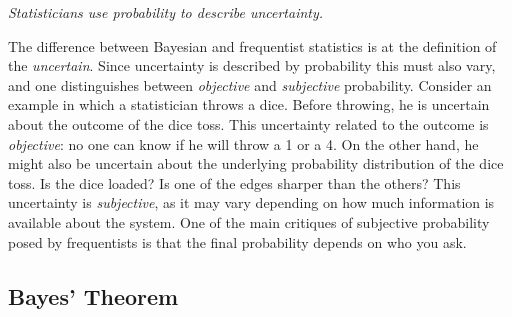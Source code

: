 \documentclass[twoside,english]{uiofysmaster}
\begin{document}
\begin{center}
\textit{Statisticians use probability to describe uncertainty.}
\end{center}

The difference between Bayesian and frequentist statistics is at the definition of the \textit{uncertain}. Since uncertainty is described by probability this must also vary, and one distinguishes between \textit{objective} and \textit{subjective} probability. Consider an example in which a statistician throws a dice. Before throwing, he is uncertain about the outcome of the dice toss. This uncertainty related to the outcome is \textit{objective}: no one can know if he will throw a 1 or a 4. On the other hand, he might also be uncertain about the underlying probability distribution of the dice toss. Is the dice loaded? Is one of the edges sharper than the others? This uncertainty is \textit{subjective}, as it may vary depending on how much information is available about the system. One of the main critiques of subjective probability posed by frequentists is that the final probability depends on who you ask.

\subsection{Bayes' Theorem}
\end{document}

